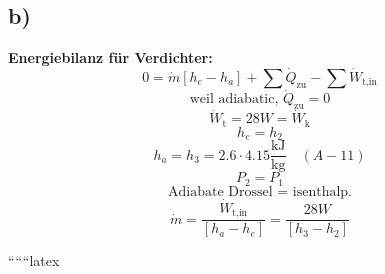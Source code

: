 

\subsection*{b)}


\textbf{Energiebilanz für Verdichter:}
\[
0 = \dot{m} \left[ h_e - h_a \right] + \sum \dot{Q}_{\text{zu}} - \sum \dot{W}_{\text{t,in}}
\]
\[
\text{weil adiabatic, } \dot{Q}_{\text{zu}} = 0
\]
\[
\dot{W}_{\text{t}} = 28W = \dot{W}_{\text{k}}
\]
\[
h_e = h_2
\]
\[
h_a = h_3 = 2.6 \cdot 4.15 \frac{\text{kJ}}{\text{kg}} \quad (A-11)
\]
\[
P_2 = P_1
\]
\[
\text{Adiabate Drossel = isenthalp.}
\]
\[
\dot{m} = \frac{\dot{W}_{\text{t,in}}}{\left[ h_a - h_e \right]} = \frac{28W}{\left[ h_3 - h_2 \right]}
\]

``````latex